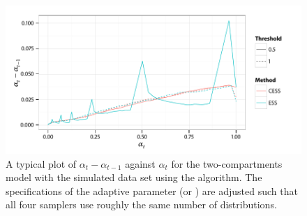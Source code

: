 \begin{figure}[t]
  \linespread{1.1}\selectfont
  \includegraphics[width=\linewidth]{fig_src/Adaptive_Dist}
  \caption[Variations of the distribution specification parameter for the
  \protect\pet compartmental model using adaptive \protect\smc algorithms]
  {A typical plot of $\alpha_t - \alpha_{t-1}$ against $\alpha_t$ for the
    two-compartments \pet model with the simulated data set using the \smc[2]
    algorithm. The specifications of the adaptive parameter (\ess or \cess)
    are adjusted such that all four samplers use roughly the same number of
    distributions.}
  \label{fig:adaptive_alpha}
\end{figure}
